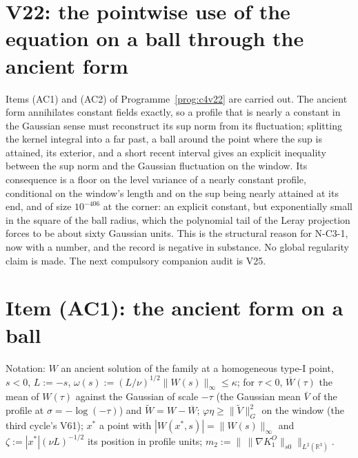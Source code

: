 \documentclass[11pt]{article}
\theoremstyle{plain}
\theoremstyle{definition}
\theoremstyle{remark}
\begin{document}
\section{V22: the pointwise use of the equation on a ball through the ancient form}
\label{sec:c4v22-entry}

Items (AC1) and (AC2) of Programme~\ref{prog:c4v22} are carried out.
The ancient form annihilates constant fields exactly, so a profile
that is nearly a constant in the Gaussian sense must reconstruct its
sup norm from its fluctuation; splitting the kernel integral into a
far past, a ball around the point where the sup is attained, its
exterior, and a short recent interval gives an explicit inequality
between the sup norm and the Gaussian fluctuation on the window.
Its consequence is a floor on the level variance of a nearly
constant profile, conditional on the window's length and on the
sup being nearly attained at its end, and of size \(10^{-406}\) at the
corner: an explicit constant, but exponentially small in the square
of the ball radius, which the polynomial tail of the Leray
projection forces to be about sixty Gaussian units.  This is the
structural reason for N-C3-1, now with a number, and the record is
negative in substance.  No global regularity claim is made.  The
next compulsory companion audit is V25.

\section{Item (AC1): the ancient form on a ball}
\label{sec:c4v22-ball}

Notation: \(W\) an ancient solution of the family at a homogeneous
type-I point, \(s<0\), \(L:=-s\), \(\omega(s):=(L/\nu)^{1/2}\|W(s)\|_\infty\le\kappa\); for \(\tau<0\),
\(\overline W(\tau)\) the mean of \(W(\tau)\) against the Gaussian of scale \(-\tau\) (the
Gaussian mean \(\bar V\) of the profile at \(\sigma=-\log(-\tau)\)) and
\(\widetilde W=W-\overline W\); \(\varphi\eta\ge\|\widetilde V\|_G^2\) on the window (the third cycle's V61);
\(x^*\) a point with \(|W(x^*,s)|=\|W(s)\|_\infty\) and \(\zeta:=|x^*|(\nu L)^{-1/2}\) its position in
profile units; \(m_2:=\|\,\|\nabla K^O_1\|_{s0}\|_{L^2(\mathbb R^3)}\).
\end{document}
